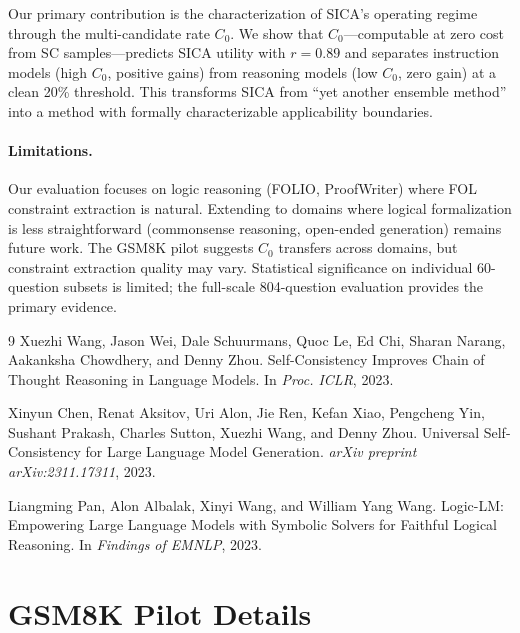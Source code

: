 \documentclass[11pt,a4paper]{article}
\begin{document}
Our primary contribution is the characterization of SICA's operating regime through the multi-candidate rate $C_0$. We show that $C_0$---computable at zero cost from SC samples---predicts SICA utility with $r=0.89$ and separates instruction models (high $C_0$, positive gains) from reasoning models (low $C_0$, zero gain) at a clean 20\% threshold. This transforms SICA from ``yet another ensemble method'' into a method with formally characterizable applicability boundaries.

\paragraph{Limitations.} Our evaluation focuses on logic reasoning (FOLIO, ProofWriter) where FOL constraint extraction is natural. Extending to domains where logical formalization is less straightforward (commonsense reasoning, open-ended generation) remains future work. The GSM8K pilot suggests $C_0$ transfers across domains, but constraint extraction quality may vary. Statistical significance on individual 60-question subsets is limited; the full-scale 804-question evaluation provides the primary evidence.


\begin{thebibliography}{9}
Xuezhi Wang, Jason Wei, Dale Schuurmans, Quoc Le, Ed Chi, Sharan Narang, Aakanksha Chowdhery, and Denny Zhou.
\newblock Self-Consistency Improves Chain of Thought Reasoning in Language Models.
\newblock In \emph{Proc. ICLR}, 2023.

Xinyun Chen, Renat Aksitov, Uri Alon, Jie Ren, Kefan Xiao, Pengcheng Yin, Sushant Prakash, Charles Sutton, Xuezhi Wang, and Denny Zhou.
\newblock Universal Self-Consistency for Large Language Model Generation.
\newblock \emph{arXiv preprint arXiv:2311.17311}, 2023.

Liangming Pan, Alon Albalak, Xinyi Wang, and William Yang Wang.
\newblock Logic-LM: Empowering Large Language Models with Symbolic Solvers for Faithful Logical Reasoning.
\newblock In \emph{Findings of EMNLP}, 2023.
\end{thebibliography}

\appendix

\section{GSM8K Pilot Details}
\label{app:gsm8k}
\end{document}
